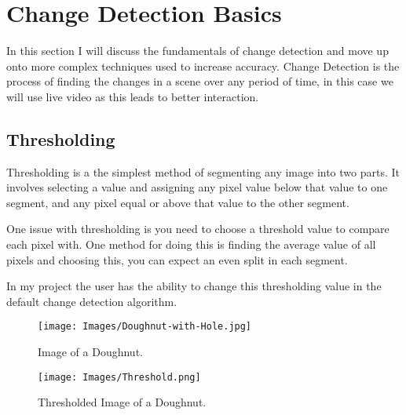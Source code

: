 \documentclass[a4paper]{report}
\begin{document}
\section{Change Detection Basics}
In this section I will discuss the fundamentals of change detection and move up onto more complex techniques used to increase accuracy. Change Detection is the process of finding the changes in a scene over any period of time, in this case we will use live video as this leads to better interaction.

\subsection{Thresholding}
Thresholding is a the simplest method of segmenting any image into two parts. It involves selecting a value and assigning any pixel value below that value to one segment, and any pixel equal or above that value to the other segment.

One issue with thresholding is you need to choose a threshold value to compare each pixel with. One method for doing this is finding the average value of all pixels and choosing this, you can expect an even split in each segment.

In my project the user has the ability to change this thresholding value in the default change detection algorithm.

\clearpage
\begin{figure}[!ht]
\centering
\texttt{[image: Images/Doughnut-with-Hole.jpg]}
\caption{\label{fig:Doughnut} Image of a Doughnut.}
\end{figure}

\begin{figure}[!ht]
\centering
\texttt{[image: Images/Threshold.png]}
\caption{\label{fig:Doughnut} Thresholded Image of a Doughnut.}
\end{figure}
\end{document}

